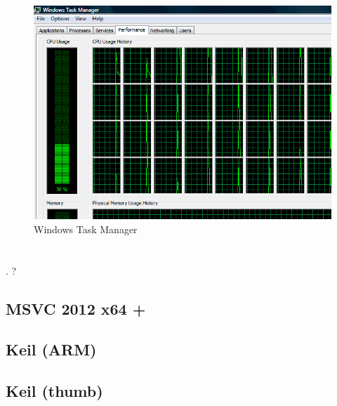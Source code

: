 \begin{figure}[H]
\centering
\includegraphics[scale=\FigScale]{exercises/taskmgr_64cpu_crop.png}
\caption{ Windows Task Manager}
\end{figure}

\section{}

.
?

\subsection{MSVC 2012 x64 + \Ox}



\subsection{Keil (ARM)}



\subsection{Keil (thumb)}



\section{}

